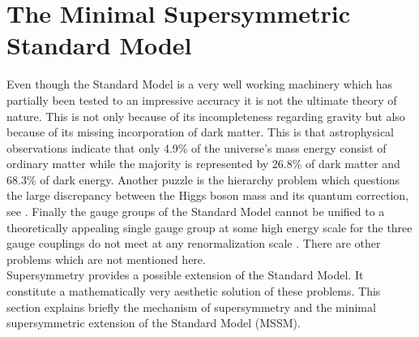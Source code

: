 \section{The Minimal Supersymmetric Standard Model}
Even though the Standard Model is a very well working machinery which has partially been tested to an impressive accuracy it is not the ultimate theory of nature. This is not only because of its incompleteness regarding gravity but also because of its missing incorporation of dark matter. This is that astrophysical observations \cite{Adam:2015rua} indicate that only 4.9\% of the universe's mass energy consist of ordinary matter while the majority is represented by 26.8\% of dark matter and 68.3\% of dark energy. Another puzzle is the hierarchy problem which questions the large discrepancy between the Higgs boson mass and its quantum correction, see \cite{Martin:1997ns}. Finally the gauge groups of the Standard Model cannot be unified to a theoretically appealing single gauge group at some high energy scale for the three gauge couplings do not meet at any renormalization scale \cite{Martin:1997ns}. There are other problems which are not mentioned here.\\
Supersymmetry provides a possible extension of the Standard Model. It constitute a mathematically very aesthetic solution of these problems. This section explains briefly the mechanism of supersymmetry and the minimal supersymmetric extension of the Standard Model (MSSM).

